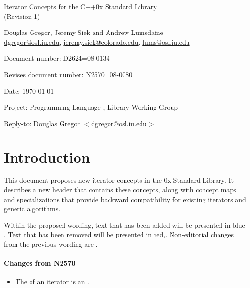 \documentclass[american,twoside]{book}
\begin{document}
\raggedbottom

\begin{titlepage}
\begin{center}
\huge
Iterator Concepts for the C++0x Standard Library\\
(Revision 1)
\vspace{0.5in}

\normalsize
Douglas Gregor, Jeremy Siek and Andrew Lumsdaine \\
\href{mailto:dgregor@osl.iu.edu}{dgregor@osl.iu.edu}, \href{mailto:jeremy.siek@colorado.edu}{jeremy.siek@colorado.edu}, \href{mailto:lums@osl.iu.edu}{lums@osl.iu.edu}
\end{center}

\vspace{1in}
\par\noindent Document number: D2624=08-0134 \vspace{-6pt}
\par\noindent Revises document number: N2570=08-0080 \vspace{-6pt}
\par\noindent Date: \today\vspace{-6pt}
\par\noindent Project: Programming Language \Cpp{}, Library Working Group\vspace{-6pt}
\par\noindent Reply-to: Douglas Gregor $<$\href{mailto:dgregor@osl.iu.edu}{dgregor@osl.iu.edu}$>$\vspace{-6pt}

\section*{Introduction}
This document proposes new iterator concepts in the \Cpp0x Standard
Library. It describes a new header  that
contains these concepts, along with concept maps and
 specializations that provide backward
compatibility for existing iterators and generic algorithms.

Within the proposed wording, text that has been added
\textcolor{addclr}{will be presented in blue} . Text that has been removed will be
presented \textcolor{remclr}{in red},. Non-editorial
changes from the previous wording are . 


\paragraph*{Changes from N2570}
\begin{itemize}
\item The  of an iterator is an .
\end{itemize}

\end{titlepage}
\end{document}
